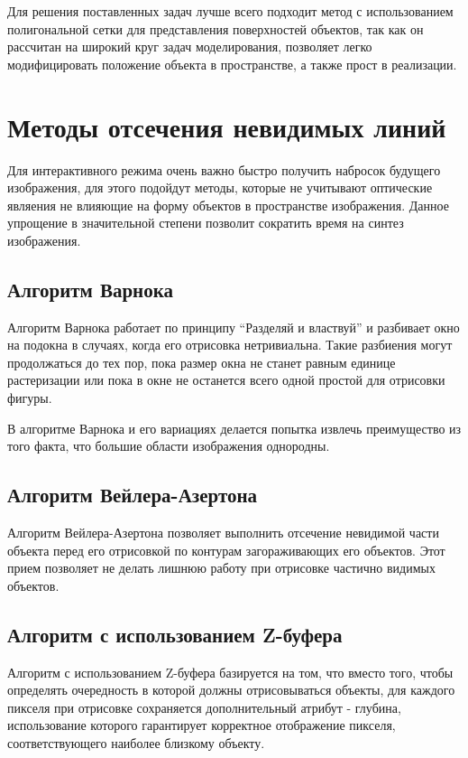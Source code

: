 Для решения поставленных задач лучше всего подходит метод с использованием полигональной сетки для представления поверхностей объектов, так как он рассчитан на широкий круг задач моделирования, позволяет легко модифицировать положение объекта в пространстве, а также прост в реализации.

\section{Методы отсечения невидимых линий}

Для интерактивного режима очень важно быстро получить набросок будущего изображения, для этого подойдут методы, которые не учитывают оптические являения не влияющие на форму объектов в пространстве изображения. Данное упрощение в значительной степени позволит сократить время на синтез изображения.

\subsection{Алгоритм Варнока}

Алгоритм Варнока работает по принципу “Разделяй и властвуй” и разбивает окно на подокна в случаях, когда его отрисовка нетривиальна. Такие разбиения могут продолжаться до тех пор, пока размер окна не станет равным единице растеризации или пока в окне не останется всего одной простой для отрисовки фигуры.

В алгоритме Варнока и его вариациях делается попытка извлечь преимущество из того факта, что большие области изображения однородны.

\subsection{Алгоритм Вейлера-Азертона}

Алгоритм Вейлера-Азертона позволяет выполнить отсечение невидимой части объекта перед его отрисовкой по контурам загораживающих его объектов. Этот прием позволяет не делать лишнюю работу при отрисовке частично видимых объектов.

\subsection{Алгоритм с использованием Z-буфера}

Алгоритм с использованием Z-буфера базируется на том, что вместо того, чтобы определять очередность в которой должны отрисовываться объекты, для каждого пикселя при отрисовке сохраняется дополнительный атрибут - глубина, использование которого гарантирует корректное отображение пикселя, соответствующего наиболее близкому объекту.

